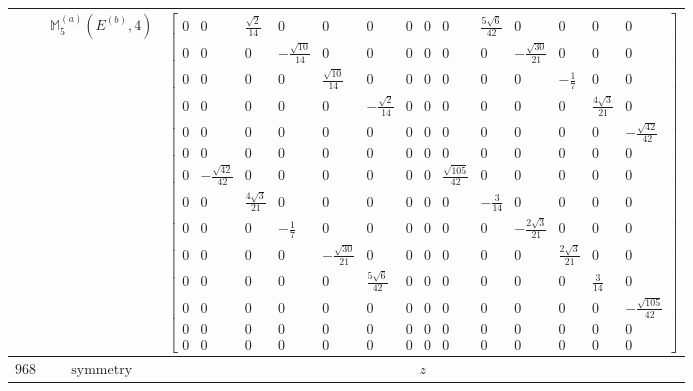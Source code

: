 \documentclass[fleqn,8pt,landscape]{jsarticle}
\begin{document}
\begin{longtable}{ccc}
$  $ & $ \mathbb{M}_{5}^{(a)}(E^{(b)},4) $ & $ \begin{bmatrix} 0 & 0 & \frac{\sqrt{2}}{14} & 0 & 0 & 0 & 0 & 0 & 0 & \frac{5 \sqrt{6}}{42} & 0 & 0 & 0 & 0 \\ 0 & 0 & 0 & - \frac{\sqrt{10}}{14} & 0 & 0 & 0 & 0 & 0 & 0 & - \frac{\sqrt{30}}{21} & 0 & 0 & 0 \\ 0 & 0 & 0 & 0 & \frac{\sqrt{10}}{14} & 0 & 0 & 0 & 0 & 0 & 0 & - \frac{1}{7} & 0 & 0 \\ 0 & 0 & 0 & 0 & 0 & - \frac{\sqrt{2}}{14} & 0 & 0 & 0 & 0 & 0 & 0 & \frac{4 \sqrt{3}}{21} & 0 \\ 0 & 0 & 0 & 0 & 0 & 0 & 0 & 0 & 0 & 0 & 0 & 0 & 0 & - \frac{\sqrt{42}}{42} \\ 0 & 0 & 0 & 0 & 0 & 0 & 0 & 0 & 0 & 0 & 0 & 0 & 0 & 0 \\ 0 & - \frac{\sqrt{42}}{42} & 0 & 0 & 0 & 0 & 0 & 0 & \frac{\sqrt{105}}{42} & 0 & 0 & 0 & 0 & 0 \\ 0 & 0 & \frac{4 \sqrt{3}}{21} & 0 & 0 & 0 & 0 & 0 & 0 & - \frac{3}{14} & 0 & 0 & 0 & 0 \\ 0 & 0 & 0 & - \frac{1}{7} & 0 & 0 & 0 & 0 & 0 & 0 & - \frac{2 \sqrt{3}}{21} & 0 & 0 & 0 \\ 0 & 0 & 0 & 0 & - \frac{\sqrt{30}}{21} & 0 & 0 & 0 & 0 & 0 & 0 & \frac{2 \sqrt{3}}{21} & 0 & 0 \\ 0 & 0 & 0 & 0 & 0 & \frac{5 \sqrt{6}}{42} & 0 & 0 & 0 & 0 & 0 & 0 & \frac{3}{14} & 0 \\ 0 & 0 & 0 & 0 & 0 & 0 & 0 & 0 & 0 & 0 & 0 & 0 & 0 & - \frac{\sqrt{105}}{42} \\ 0 & 0 & 0 & 0 & 0 & 0 & 0 & 0 & 0 & 0 & 0 & 0 & 0 & 0 \\ 0 & 0 & 0 & 0 & 0 & 0 & 0 & 0 & 0 & 0 & 0 & 0 & 0 & 0 \end{bmatrix} $ \\ \hline
$ 968 $ & $ \text{symmetry} $ & $ z $ \\

\end{longtable}
\end{document}
